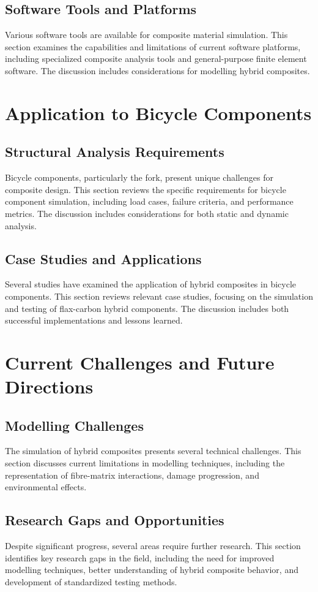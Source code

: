 \documentclass[11pt,twocolumn]{article}
\begin{document}
\subsection{Software Tools and Platforms}
Various software tools are available for composite material simulation. This section examines the capabilities and limitations of current software platforms, including specialized composite analysis tools and general-purpose finite element software. The discussion includes considerations for modelling hybrid composites.

\section{Application to Bicycle Components}
\subsection{Structural Analysis Requirements}
Bicycle components, particularly the fork, present unique challenges for composite design. This section reviews the specific requirements for bicycle component simulation, including load cases, failure criteria, and performance metrics. The discussion includes considerations for both static and dynamic analysis.

\subsection{Case Studies and Applications}
Several studies have examined the application of hybrid composites in bicycle components. This section reviews relevant case studies, focusing on the simulation and testing of flax-carbon hybrid components. The discussion includes both successful implementations and lessons learned.

\section{Current Challenges and Future Directions}
\subsection{Modelling Challenges}
The simulation of hybrid composites presents several technical challenges. This section discusses current limitations in modelling techniques, including the representation of fibre-matrix interactions, damage progression, and environmental effects.

\subsection{Research Gaps and Opportunities}
Despite significant progress, several areas require further research. This section identifies key research gaps in the field, including the need for improved modelling techniques, better understanding of hybrid composite behavior, and development of standardized testing methods.
\end{document}
